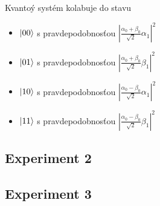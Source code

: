 \begin{itemize}
Kvantoý systém kolabuje do stavu
    \begin{itemize}
        \item[] \(\ket{00}\) s pravdepodobnosťou \(|\frac{\alpha_0 + \beta_0}{\sqrt{2}}\alpha_1|^2\)
        \item[] \(\ket{01}\) s pravdepodobnosťou \(|\frac{\alpha_0 + \beta_0}{\sqrt{2}}\beta_1|^2\)
        \item[] \(\ket{10}\) s pravdepodobnosťou \(|\frac{\alpha_0 - \beta_0}{\sqrt{2}}\alpha_1|^2\)
        \item[] \(\ket{11}\) s pravdepodobnosťou \(|\frac{\alpha_0 - \beta_0}{\sqrt{2}}\beta_1|^2\) 
    \end{itemize}

\end{itemize}

\subsection{Experiment 2}
\subsection{Experiment 3}
